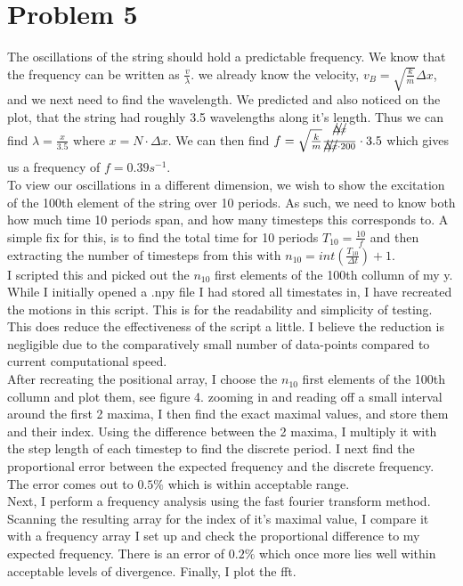\documentclass[12pt]{article}
\begin{document}
\section*{Problem 5}
	The oscillations of the string should hold a predictable frequency. We know that the frequency can be written as $\frac{v}{\lambda}$. we already know the velocity, $v_B = \sqrt{\frac{k}{m}} \Delta x$, and we next need to find the wavelength. We predicted and also noticed on the plot, that the string had roughly 3.5 wavelengths along it's length. Thus we can find $\lambda = \frac{x}{3.5}$ where $ x = N \cdot \Delta x$. We can then find $f = \sqrt{\frac{k}{m}}\frac{\xout{\Delta x}}{\xout{\Delta x} \cdot 200}\cdot 3.5$ which gives us a frequency of $f = 0.39s^{-1}$. \\
	To view our oscillations in a different dimension, we wish to show the excitation of the 100th element of the string over 10 periods. As such, we need to know both how much time 10 periods span, and how many timesteps this corresponds to. A simple fix for this, is to find the total time for 10 periods $T_{10} = \frac{10}{f}$ and then extracting the number of timesteps from this with $n_{10} = int(\frac{T_{10}}{\Delta t})+1$. \\
	I scripted this and picked out the $n_{10}$ first elements of the 100th collumn of my y. While I initially opened a .npy file I had stored all timestates in, I have recreated the motions in this script. This is for the readability and simplicity of testing. This does reduce the effectiveness of the script a little. I believe the reduction is negligible due to the comparatively small number of data-points compared to current computational speed. \\
	After recreating the positional array, I choose the $n_{10}$ first elements of the 100th collumn and plot them, see figure 4. zooming in and reading off a small interval around the first 2 maxima, I then find the exact maximal values, and store them and their index. Using the difference between the 2 maxima, I multiply it with the step length of each timestep to find the discrete period. I next find the proportional error between the expected frequency and the discrete frequency. The error comes out to $0.5\%$ which is within acceptable range. \\
	Next, I perform a frequency analysis using the fast fourier transform method. Scanning the resulting array for the index of it's maximal value, I compare it with a frequency array I set up and check the proportional difference to my expected frequency. There is an error of $0.2\%$ which once more lies well within acceptable levels of divergence. Finally, I plot the fft.
	
\end{document}
